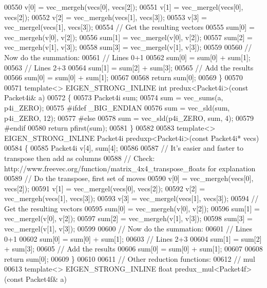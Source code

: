 \begin{DoxyCode}
{00550   v[0] = vec\_mergeh(vecs[0], vecs[2]);
00551   v[1] = vec\_mergel(vecs[0], vecs[2]);
00552   v[2] = vec\_mergeh(vecs[1], vecs[3]);
00553   v[3] = vec\_mergel(vecs[1], vecs[3]);
00554   \textcolor{comment}{// Get the resulting vectors}
00555   sum[0] = vec\_mergeh(v[0], v[2]);
00556   sum[1] = vec\_mergel(v[0], v[2]);
00557   sum[2] = vec\_mergeh(v[1], v[3]);
00558   sum[3] = vec\_mergel(v[1], v[3]);
00559 
00560   \textcolor{comment}{// Now do the summation:}
00561   \textcolor{comment}{// Lines 0+1}
00562   sum[0] = sum[0] + sum[1];
00563   \textcolor{comment}{// Lines 2+3}
00564   sum[1] = sum[2] + sum[3];
00565   \textcolor{comment}{// Add the results}
00566   sum[0] = sum[0] + sum[1];
00567 
00568   \textcolor{keywordflow}{return} sum[0];
00569 \}
00570 
00571 \textcolor{keyword}{template}<> EIGEN\_STRONG\_INLINE \textcolor{keywordtype}{int} predux<Packet4i>(\textcolor{keyword}{const} Packet4i& a)
00572 \{
00573   Packet4i sum;
00574   sum = vec\_sums(a, p4i\_ZERO);
00575 \textcolor{preprocessor}{#ifdef \_BIG\_ENDIAN}
00576   sum = vec\_sld(sum, p4i\_ZERO, 12);
00577 \textcolor{preprocessor}{#else}
00578   sum = vec\_sld(p4i\_ZERO, sum, 4);
00579 \textcolor{preprocessor}{#endif}
00580   \textcolor{keywordflow}{return} pfirst(sum);
00581 \}
00582 
00583 \textcolor{keyword}{template}<> EIGEN\_STRONG\_INLINE Packet4i preduxp<Packet4i>(\textcolor{keyword}{const} Packet4i* vecs)
00584 \{
00585   Packet4i v[4], sum[4];
00586 
00587   \textcolor{comment}{// It's easier and faster to transpose then add as columns}
00588   \textcolor{comment}{// Check: http://www.freevec.org/function/matrix\_4x4\_transpose\_floats for explanation}
00589   \textcolor{comment}{// Do the transpose, first set of moves}
00590   v[0] = vec\_mergeh(vecs[0], vecs[2]);
00591   v[1] = vec\_mergel(vecs[0], vecs[2]);
00592   v[2] = vec\_mergeh(vecs[1], vecs[3]);
00593   v[3] = vec\_mergel(vecs[1], vecs[3]);
00594   \textcolor{comment}{// Get the resulting vectors}
00595   sum[0] = vec\_mergeh(v[0], v[2]);
00596   sum[1] = vec\_mergel(v[0], v[2]);
00597   sum[2] = vec\_mergeh(v[1], v[3]);
00598   sum[3] = vec\_mergel(v[1], v[3]);
00599 
00600   \textcolor{comment}{// Now do the summation:}
00601   \textcolor{comment}{// Lines 0+1}
00602   sum[0] = sum[0] + sum[1];
00603   \textcolor{comment}{// Lines 2+3}
00604   sum[1] = sum[2] + sum[3];
00605   \textcolor{comment}{// Add the results}
00606   sum[0] = sum[0] + sum[1];
00607 
00608   \textcolor{keywordflow}{return} sum[0];
00609 \}
00610 
00611 \textcolor{comment}{// Other reduction functions:}
00612 \textcolor{comment}{// mul}
00613 \textcolor{keyword}{template}<> EIGEN\_STRONG\_INLINE \textcolor{keywordtype}{float} predux\_mul<Packet4f>(\textcolor{keyword}{const} Packet4f& a)
}
\end{DoxyCode}
